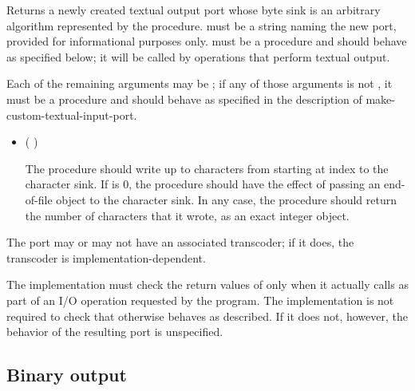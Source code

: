 \begin{entry}{%
}

Returns a newly created textual output port whose byte sink is
an arbitrary algorithm represented by the  procedure.
 must be a string naming the new port,
provided for informational purposes only.
 must be a procedure and should behave as specified
below; it will be called by operations that perform textual output.

Each of the remaining arguments may be \schfalse{}; if any of
those arguments is not \schfalse{}, it must be a procedure and
should behave as specified in the description of
{\cf make-custom-textual-input-port}.
   
\begin{itemize}
\item {\cf (   )}
       
  The  procedure should write up to  characters
  from  starting at index  
  to the character sink.
  If  is 0, the  procedure should
  have the effect of passing an end-of-file object to the character sink.
  In any case, the  procedure should return the number of
  characters that it wrote, as an exact integer object.
\end{itemize}

The port may or may not have an associated transcoder; if it does, the
transcoder is implementation-dependent.

\implresp The implementation must check the return
values of  only when it actually calls  as part of
an I/O operation requested by the program.  The implementation is not
required to check that  otherwise behaves as described.
If it does not, however, the behavior of the resulting port is
unspecified.
\end{entry}

\subsection{Binary output}\unsection

